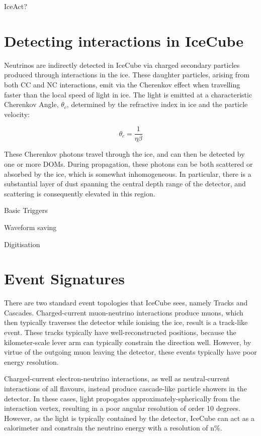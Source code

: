 IceAct?

\section{Detecting interactions in IceCube}

Neutrinos are indirectly detected in IceCube via charged secondary particles produced through interactions in the ice. These daughter particles, arising from both CC and NC interactions, emit via the Cherenkov effect when travelling faster than the local speed of light in ice. The light is emitted at a characteristic Cherenkov Angle, $\theta_{c}$, determined by the refractive index in ice and the particle velocity:

\[\theta_{c} = \frac{1}{\eta \beta}\]

These Cherenkov photons travel through the ice, and can then be detected by one or more DOMs. During propagation, these photons can be both scattered or absorbed by the ice, which is somewhat inhomogeneous. In particular, there is a substantial layer of dust spanning the central depth range of the detector, and scattering is consequently elevated in this region.

Basic Triggers

Waveform saving

Digitisation

\section{Event Signatures}

There are two standard event topologies that IceCube sees, namely Tracks and Cascades. Charged-current muon-neutrino interactions produce muons, which then typically traverses the detector while ionising the ice, result is a track-like event. These tracks typically have well-reconstructed positions, because the kilometer-scale lever arm can typically constrain the direction well. However, by virtue of the outgoing muon leaving the detector, these events typically have poor energy resolution. 

Charged-current electron-neutrino interactions, as well as neutral-current interactions of all flavours, instead produce cascade-like particle showers in the detector. In these cases, light propogates approximately-spherically from the interaction vertex, resulting in a poor angular resolution of order 10 degrees. However, as the light is typically contained by the detector, IceCube can act as a calorimeter and constrain the neutrino energy with a resolution of n\%. 

